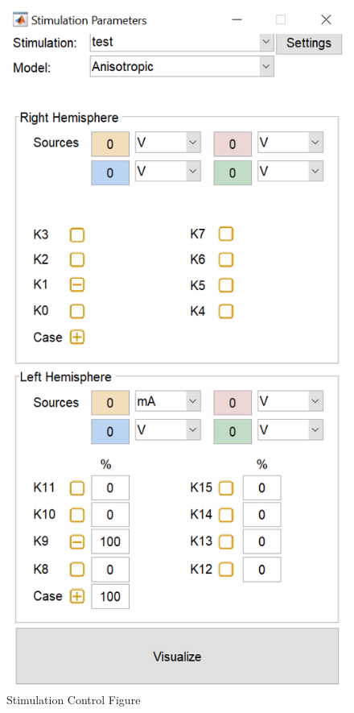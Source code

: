 \documentclass[a4paper,11pt]{article}
\begin{document}
\begin{figure}
\begin{center}
	\includegraphics{images/stim.png}
	\caption{Stimulation Control Figure}
	\label{fig:stim}
\end{center}
\end{figure}
\end{document}

